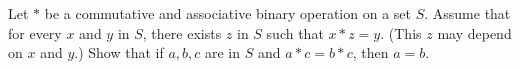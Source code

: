Let $*$ be a commutative and associative binary operation on a set $S$. Assume that for every $x$
and $y$ in $S$, there exists $z$ in $S$ such that $x * z = y$. (This $z$ may depend on $x$ and $y$.)
Show that if $a,b,c$ are in $S$ and $a*c = b*c$, then $a=b$.

